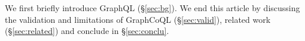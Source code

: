 We first briefly introduce GraphQL (\S\ref{sec:bg}). We end this article by discussing the validation and limitations of GraphCoQL (\S\ref{sec:valid}), related work (\S\ref{sec:related}) and conclude in \S\ref{sec:conclu}.




